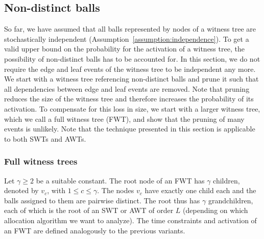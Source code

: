 \documentclass[a4paper,12pt]{article}
\begin{document}
\subsection{Non-distinct balls}
\label{sec:analysis:nondistinctBalls}
So far, we have assumed that all balls represented by nodes of a witness tree are stochastically independent (Assumption~\ref{assumption:independence}). To get a valid upper bound on the probability for the activation of a witness tree, the possibility of non-distinct balls has to be accounted for. In this section, we do not require the edge and leaf events of the witness tree to be independent any more. We start with a witness tree referencing non-distinct balls and prune it such that all dependencies between edge and leaf events are removed. Note that pruning reduces the size of the witness tree and therefore increases the probability of its activation. To compensate for this loss in size, we start with a larger witness tree, which we call a full witness tree (FWT), and show that the pruning of many events is unlikely. Note that the technique presented in this section is applicable to both SWTs and AWTs. 

\subsubsection{Full witness trees}
\label{sec:analysis:FullWT}
Let $\gamma \geq 2$ be a suitable constant. The root node of an FWT has $\gamma$ children, denoted by $v_c$, with $1\leq c \leq \gamma$. The nodes $v_c$ have exactly one child each and the balls assigned to them are pairwise distinct. The root thus has $\gamma$ grandchildren, each of which is the root of an SWT or AWT of order $L$ (depending on which allocation algorithm we want to analyze). The time constraints and activation of an FWT are defined analogously to the previous variants.
\end{document}
